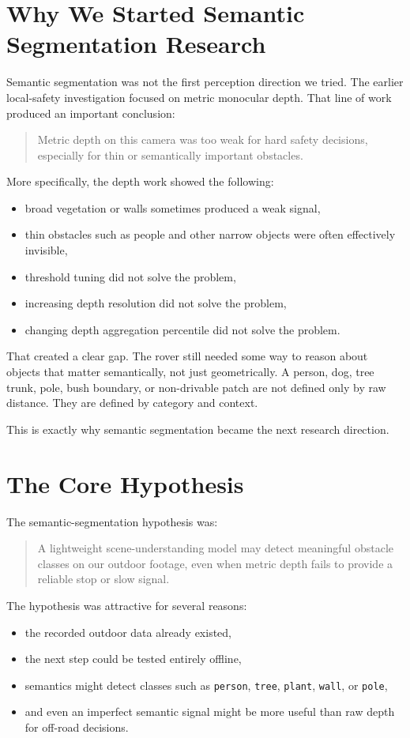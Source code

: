 \documentclass[11pt]{article}
\begin{document}
\section{Why We Started Semantic Segmentation Research}
Semantic segmentation was not the first perception direction we tried. The earlier local-safety investigation focused on metric monocular depth. That line of work produced an important conclusion:
\begin{quote}
Metric depth on this camera was too weak for hard safety decisions, especially for thin or semantically important obstacles.
\end{quote}

More specifically, the depth work showed the following:
\begin{itemize}[leftmargin=*]
\item broad vegetation or walls sometimes produced a weak signal,
\item thin obstacles such as people and other narrow objects were often effectively invisible,
\item threshold tuning did not solve the problem,
\item increasing depth resolution did not solve the problem,
\item changing depth aggregation percentile did not solve the problem.
\end{itemize}

That created a clear gap. The rover still needed some way to reason about objects that matter semantically, not just geometrically. A person, dog, tree trunk, pole, bush boundary, or non-drivable patch are not defined only by raw distance. They are defined by category and context.

This is exactly why semantic segmentation became the next research direction.

\section{The Core Hypothesis}
The semantic-segmentation hypothesis was:
\begin{quote}
A lightweight scene-understanding model may detect meaningful obstacle classes on our outdoor footage, even when metric depth fails to provide a reliable stop or slow signal.
\end{quote}

The hypothesis was attractive for several reasons:
\begin{itemize}[leftmargin=*]
\item the recorded outdoor data already existed,
\item the next step could be tested entirely offline,
\item semantics might detect classes such as \texttt{person}, \texttt{tree}, \texttt{plant}, \texttt{wall}, or \texttt{pole},
\item and even an imperfect semantic signal might be more useful than raw depth for off-road decisions.
\end{itemize}
\end{document}

